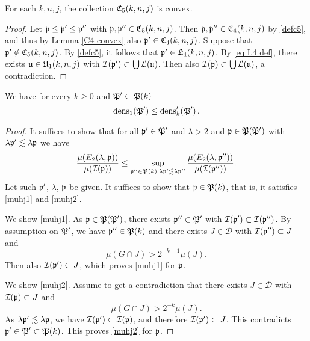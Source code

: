 {\begin{lemma}
    \label{C5 convex}
    For each $k,n,j$, the collection $\mathfrak C_5(k,n,j)$ is convex.
\end{lemma}

\begin{proof}
    Let $\mathfrak p \le \mathfrak p' \le\mathfrak p''$ with $\mathfrak p, \mathfrak p'' \in \mathfrak C_5(k,n,j)$. Then $\mathfrak p, \mathfrak p'' \in \mathfrak C_4(k,n,j)$ by \eqref{defc5}, and thus by Lemma \ref{C4 convex} also $\mathfrak p' \in \mathfrak C_4(k,n,j)$. Suppose that $\mathfrak p' \notin \mathfrak C_5(k,n,j)$. By \eqref{defc5}, it follows that $\mathfrak p' \in \mathfrak L_4(k,n,j)$.
    By \eqref{eq L4 def}, there exists $\mathfrak u \in \mathfrak U_1(k,n,j)$ with $\mathcal{I}(\mathfrak p') \subset \bigcup \mathcal{L}(\mathfrak u)$. Then also $\mathcal{I}(\mathfrak p) \subset \bigcup \mathcal{L}(\mathfrak u)$, a contradiction.
\end{proof}

\begin{lemma}
    \label{dens compare}
    We have for every $k\ge 0$ and $\mathfrak P'\subset \mathfrak P(k)$
\begin{equation}
    \operatorname{\operatorname{dens}}_1(\mathfrak P')\le \operatorname{\operatorname{dens}}_k'(\mathfrak P')\, .
\end{equation}
\end{lemma}
\begin{proof}
It suffices to show that for all $\mathfrak p'\in \mathfrak P'$
and  $\lambda>2$ and  $\mathfrak p\in \mathfrak P(\mathfrak P')$ with $\lambda \mathfrak p' \lesssim \lambda \mathfrak p$ we have
\begin{equation}
    \frac{\mu({E}_2(\lambda, \mathfrak p))}{\mu(\mathcal{I}(\mathfrak p))}
    \le \sup_{\mathfrak p'' \in \mathfrak P(k): \lambda \mathfrak p' \lesssim \lambda \mathfrak p''}
    \frac{\mu({E}_2(\lambda, \mathfrak p''))}{\mu(\mathcal{I}(\mathfrak p''))}.
\end{equation}
    Let such $\mathfrak p'$, $\lambda$, $\mathfrak p$ be given.
    It suffices to show that $\mathfrak p\in \mathfrak P(k)$,
    that is, it satisfies \eqref{muhj1}
    and \eqref{muhj2}.

We show \eqref{muhj1}.
 As $\mathfrak p\in \mathfrak P(\mathfrak P')$, there exists
$\mathfrak p''\in \mathfrak P'$ with $\mathcal{I}(\mathfrak p')\subset \mathcal{I}(\mathfrak p'')$. By assumption on $\mathfrak P'$, we have  $\mathfrak p''\in \mathfrak P(k)$ and there exists
$J\in \mathcal{D}$ with
   $\mathcal{I}(\mathfrak p'')\subset J$ and
   \begin{equation}
       \mu(G\cap J)>2^{-k-1} \mu(J).
   \end{equation}
Then also $\mathcal{I}(\mathfrak p')\subset J$, which proves
\eqref{muhj1} for $\mathfrak p$.

We show \eqref{muhj2}. Assume to get a contradiction that
there exists $J\in \mathcal{D}$ with
   $\mathcal{I}(\mathfrak p)\subset J$ and
   \begin{equation}\label{mugj}
       \mu(G\cap J)>2^{-k} \mu(J).
   \end{equation}
   As $\lambda\mathfrak p'\lesssim \lambda\mathfrak p$, we have $\mathcal{I}(\mathfrak p')\subset \mathcal{I}(\mathfrak p)$, and therefore
    $\mathcal{I}(\mathfrak p')\subset J$. This contradicts
   $\mathfrak p'\in \mathfrak P'\subset \mathfrak P(k)$. This proves
\eqref{muhj2} for $\mathfrak p$.
\end{proof}

}

